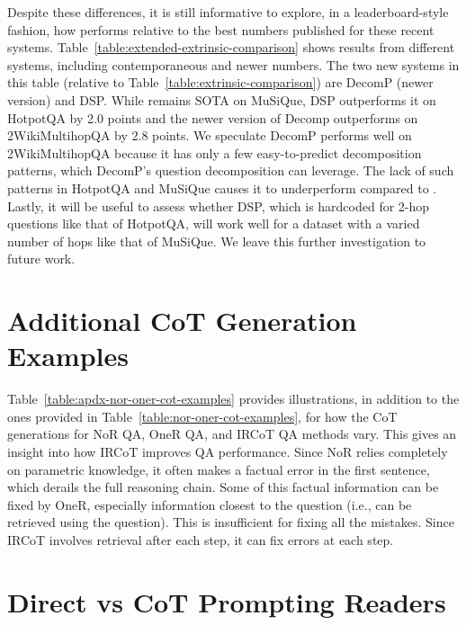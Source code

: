 Despite these differences, it is still informative to explore, in a leaderboard-style fashion, how \iconsys performs relative to the best numbers published for these recent systems. Table~\ref{table:extended-extrinsic-comparison} shows results from different systems, including contemporaneous and newer numbers. The two new systems in this table (relative to Table~\ref{table:extrinsic-comparison}) are DecomP (newer version) and DSP. While \iconsys remains SOTA on MuSiQue, DSP outperforms it on HotpotQA by 2.0 points and the newer version of Decomp outperforms \iconsys on 2WikiMultihopQA by 2.8 points. We speculate DecomP performs well on 2WikiMultihopQA because it has only a few easy-to-predict decomposition patterns, which DecomP's question decomposition can leverage. The lack of such patterns in HotpotQA and MuSiQue causes it to underperform compared to \iconsys. Lastly, it will be useful to assess whether DSP, which is hardcoded for 2-hop questions like that of HotpotQA, will work well for a dataset with a varied number of hops like that of MuSiQue. We leave this further investigation to future work.


\section{Additional CoT Generation Examples}
\label{sec:apdx-nor-oner-cot-examples}

Table~\ref{table:apdx-nor-oner-cot-examples} provides illustrations, in addition to the ones provided in Table~\ref{table:nor-oner-cot-examples}, for how the CoT generations for NoR QA, OneR QA, and IRCoT QA methods vary. This gives an insight into how IRCoT improves QA performance. Since NoR relies completely on parametric knowledge, it often makes a factual error in the first sentence, which derails the full reasoning chain. Some of this factual information can be fixed by OneR, especially information closest to the question (i.e., can be retrieved using the question). This is insufficient for fixing all the mistakes. Since IRCoT involves retrieval after each step, it can fix errors at each step.




\section{Direct vs CoT Prompting Readers}
\label{sec:apndx-readers-results}

